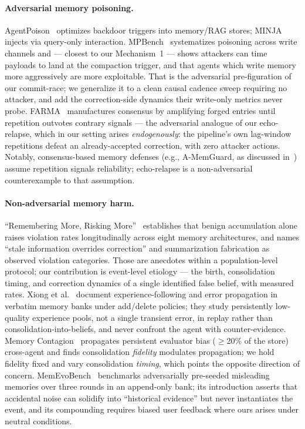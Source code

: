 \documentclass[11pt]{article}
\begin{document}
\paragraph{Adversarial memory poisoning.} AgentPoison~\cite{agentpoison} optimizes backdoor triggers into memory/RAG stores; MINJA~\cite{minja} injects via query-only interaction. MPBench~\cite{mpbench} systematizes poisoning across write channels and --- closest to our Mechanism~1 --- shows attackers can time payloads to land at the compaction trigger, and that agents which write memory more aggressively are more exploitable. That is the adversarial pre-figuration of our commit-race; we generalize it to a clean causal cadence sweep requiring no attacker, and add the correction-side dynamics their write-only metrics never probe. FARMA~\cite{farma} manufactures consensus by amplifying forged entries until repetition outvotes contrary signals --- the adversarial analogue of our echo-relapse, which in our setting arises \emph{endogenously}: the pipeline's own lag-window repetitions defeat an already-accepted correction, with zero attacker actions. Notably, consensus-based memory defenses (e.g., A-MemGuard, as discussed in~\cite{farma}) assume repetition signals reliability; echo-relapse is a non-adversarial counterexample to that assumption.

\paragraph{Non-adversarial memory harm.} ``Remembering More, Risking More''~\cite{rmrm} establishes that benign accumulation alone raises violation rates longitudinally across eight memory architectures, and names ``stale information overrides correction'' and summarization fabrication as observed violation categories. Those are anecdotes within a population-level protocol; our contribution is event-level etiology --- the birth, consolidation timing, and correction dynamics of a single identified false belief, with measured rates. Xiong et al.~\cite{xiong} document experience-following and error propagation in verbatim memory banks under add/delete policies; they study persistently low-quality experience pools, not a single transient error, in replay rather than consolidation-into-beliefs, and never confront the agent with counter-evidence. Memory Contagion~\cite{contagion} propagates persistent evaluator bias ($\ge$20\% of the store) cross-agent and finds consolidation \emph{fidelity} modulates propagation; we hold fidelity fixed and vary consolidation \emph{timing}, which points the opposite direction of concern. MemEvoBench~\cite{memevo} benchmarks adversarially pre-seeded misleading memories over three rounds in an append-only bank; its introduction asserts that accidental noise can solidify into ``historical evidence'' but never instantiates the event, and its compounding requires biased user feedback where ours arises under neutral conditions.
\end{document}
